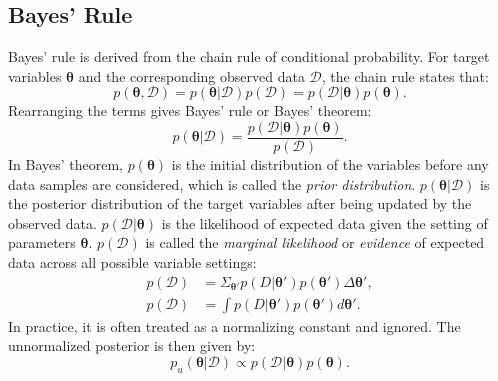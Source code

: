 \subsection{Bayes' Rule}
Bayes' rule is derived from the chain rule of conditional probability. For target variables $\boldsymbol{\theta}$ and the corresponding observed data $\mathcal{D}$, the chain rule states that:
\begin{equation}
    p(\boldsymbol{\theta}, \mathcal{D}) = p(\boldsymbol{\theta}|\mathcal{D})p(\mathcal{D}) = p(\mathcal{D}|\boldsymbol{\theta})p(\boldsymbol{\theta}).
\end{equation}
Rearranging the terms gives Bayes' rule or Bayes' theorem:
\begin{equation}
\label{eq:bayes}
    p(\boldsymbol{\theta}|\mathcal{D})= \frac{p(\mathcal{D}|\boldsymbol{\theta})p(\boldsymbol{\theta})}{p(\mathcal{D})}.
\end{equation}
In Bayes' theorem, $p(\boldsymbol{\theta})$ is the initial distribution of the variables before any data samples are considered, which is called the \textit{prior distribution}. $p(\boldsymbol{\theta}|\mathcal{D})$ is the posterior distribution of the target variables after being updated by the observed data. $p(\mathcal{D}|\boldsymbol{\theta})$ is the likelihood of expected data given the setting of parameters $\boldsymbol{\theta}$. $p(\mathcal{D})$ is called the \textit{marginal likelihood} or \textit{evidence} of expected data across all possible variable settings:
\begin{subequations}
    \begin{align}
    p(\mathcal{D}) &= \Sigma_{\boldsymbol{\theta}'}p(D|\boldsymbol{\theta}')p(\boldsymbol{\theta}')\Delta \boldsymbol{\theta}',\\
    p(\mathcal{D}) &= \int p(D|\boldsymbol{\theta}')p(\boldsymbol{\theta}')d\boldsymbol{\theta}'.
    \end{align}
\end{subequations}
In practice, it is often treated as a normalizing constant and ignored. The unnormalized posterior is then given by:
\begin{equation}
    p_u(\boldsymbol{\theta}|\mathcal{D}) \propto p(\mathcal{D}|\boldsymbol{\theta})p(\boldsymbol{\theta}).            
\end{equation}

